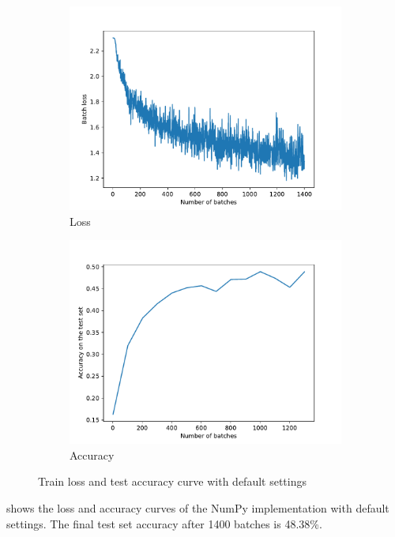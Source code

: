 \documentclass{article}
\begin{document}
\begin{figure}
  \centering
  \begin{subfigure}{.49\linewidth}
    \includegraphics[width=\linewidth]{fig/np_default/loss_curve.pdf}
    \caption{Loss}
  \end{subfigure}
  \begin{subfigure}{.49\linewidth}
    \includegraphics[width=\linewidth]{fig/np_default/accuracy_curve.pdf}
    \caption{Accuracy}
  \end{subfigure}
  \caption{Train loss and test accuracy curve with default settings}
  \label{fig:np_default}
\end{figure}

 shows the loss and accuracy curves of the NumPy implementation
with default settings. The final test set accuracy after 1400 batches is 48.38\%.
\end{document}
